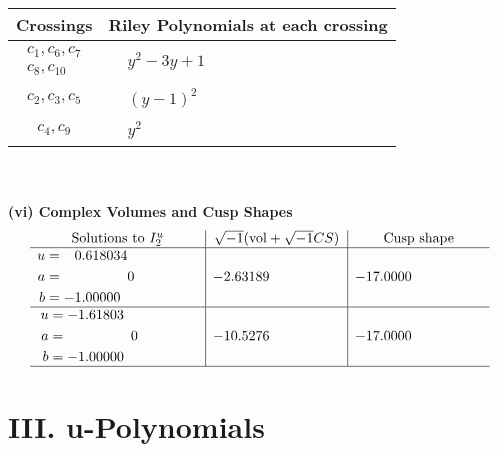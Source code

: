 \documentclass[1p]{elsarticle_modified}
\theoremstyle{definition}
\newcommand{\I}{\sqrt{-1}}
\begin{document}
\begin{tabular}{m{50pt}|m{274pt}}
Crossings & \hspace{64pt}Riley Polynomials at each crossing \\
\hline $$\begin{aligned}c_{1},c_{6},c_{7}\\c_{8},c_{10}\end{aligned}$$&$\begin{aligned}
&y^2-3 y+1
\end{aligned}$\\
\hline $$\begin{aligned}c_{2},c_{3},c_{5}\end{aligned}$$&$\begin{aligned}
&(y-1)^2
\end{aligned}$\\
\hline $$\begin{aligned}c_{4},c_{9}\end{aligned}$$&$\begin{aligned}
&y^2
\end{aligned}$\\
\hline
\end{tabular}\\~\\
\newpage\flushleft \textbf{(vi) Complex Volumes and Cusp Shapes}
$$\begin{array}{c|c|c}  
\text{Solutions to }I^u_{2}& \I (\text{vol} + \sqrt{-1}CS) & \text{Cusp shape}\\
 \hline 
\begin{aligned}
u &= \phantom{-}0.618034\phantom{ +0.000000I} \\
a &= \phantom{-0.000000 } 0 \\
b &= -1.00000\phantom{ +0.000000I}\end{aligned}
 & -2.63189\phantom{ +0.000000I} & -17.0000\phantom{ +0.000000I} \\ \hline\begin{aligned}
u &= -1.61803\phantom{ +0.000000I} \\
a &= \phantom{-0.000000 } 0 \\
b &= -1.00000\phantom{ +0.000000I}\end{aligned}
 & -10.5276\phantom{ +0.000000I} & -17.0000\phantom{ +0.000000I}\\
 \hline 
 \end{array}$$\newpage
\newpage\renewcommand{\arraystretch}{1}
\centering \section*{ III. u-Polynomials}
\end{document}
